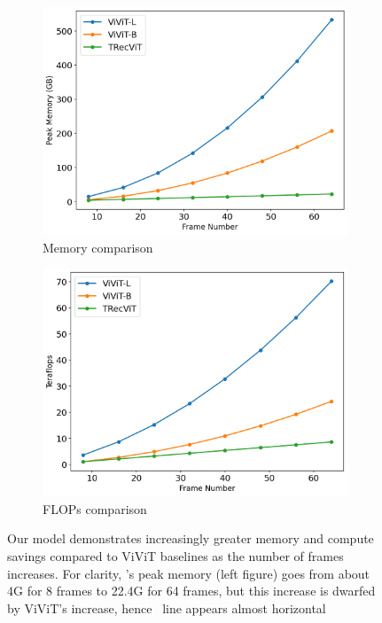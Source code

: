 \begin{figure}[t!]
\centering
\begin{subfigure}{0.48\textwidth}
    \centering
    \includegraphics[width=.9\textwidth]{img/memory.png}
    \caption{Memory comparison}
\end{subfigure}%
\hfill
\begin{subfigure}{0.48\textwidth}
    \centering
    \includegraphics[width=.9\textwidth]{img/flops.png} 
    \caption{FLOPs comparison}
\end{subfigure}
\caption{Our model demonstrates increasingly greater memory and compute savings compared to ViViT baselines as the number of frames increases. For clarity, \ssm's peak memory (left figure) goes from about 4G for 8 frames to 22.4G for 64 frames, but this increase is dwarfed by ViViT's increase, hence \ssm\ line appears almost horizontal
}
\label{fig:memory}
\end{figure}

